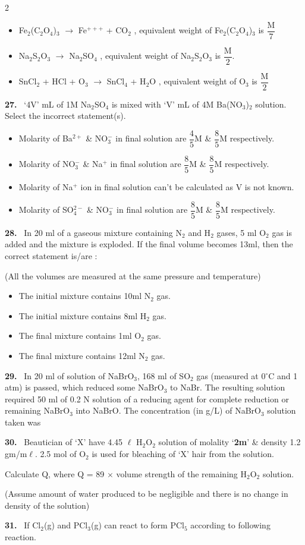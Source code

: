\documentclass[10pt]{extarticle}
\newcommand{\qn}[1]{\par\smallskip\noindent\textbf{#1.}~}
\newenvironment{qoptions}{\begin{itemize}[leftmargin=1.8em,itemsep=1pt,topsep=2pt,label={}]}{\end{itemize}}
\newcommand{\opt}[2]{\item[(#1)] #2}
\begin{document}
\begin{multicols}{2}
\begin{qoptions}
\opt{B}{Fe$_2$(C$_2$O$_4$)$_3$ $\longrightarrow$ Fe$^{+++}$ + CO$_2$ , equivalent weight of Fe$_2$(C$_2$O$_4$)$_3$ is $\dfrac{\mathrm M}7$}
\opt{C}{Na$_2$S$_2$O$_3$ $\longrightarrow$ Na$_2$SO$_4$ , equivalent weight of Na$_2$S$_2$O$_3$ is $\dfrac{\mathrm M}2$.}
\opt{D}{SnCl$_2$ + HCl + O$_3$ $\longrightarrow$ SnCl$_4$ + H$_2$O , equivalent weight of O$_3$ is $\dfrac{\mathrm M}2$}
\end{qoptions}
\qn{27} `4V' mL of 1M Na$_2$SO$_4$ is mixed with `V' mL of 4M Ba(NO$_3$)$_2$ solution. Select the incorrect statement(s).
\begin{qoptions}
\opt{A}{Molarity of Ba$^{2+}$ \& NO$_3^-$ in final solution are $\dfrac45$M \& $\dfrac85$M respectively.}
\opt{B}{Molarity of NO$_3^-$ \& Na$^+$ in final solution are $\dfrac85$M \& $\dfrac85$M respectively.}
\opt{C}{Molarity of Na$^+$ ion in final solution can't be calculated as V is not known.}
\opt{D}{Molarity of SO$_4^{2-}$ \& NO$_3^-$ in final solution are $\dfrac85$M \& $\dfrac85$M respectively.}
\end{qoptions}
\qn{28} In 20 ml of a gaseous mixture containing N$_2$ and H$_2$ gases, 5 ml O$_2$ gas is added and the mixture is exploded. If the final volume becomes 13ml, then the correct statement is/are :\par
(All the volumes are measured at the same pressure and temperature)
\begin{qoptions}
\opt{A}{The initial mixture contains 10ml N$_2$ gas.}
\opt{B}{The initial mixture contains 8ml H$_2$ gas.}
\opt{C}{The final mixture contains 1ml O$_2$ gas.}
\opt{D}{The final mixture contains 12ml N$_2$ gas.}
\end{qoptions}
\qn{29} In 20 ml of solution of NaBrO$_3$, 168 ml of SO$_2$ gas (measured at 0$^\circ$C and 1 atm) is passed, which reduced some NaBrO$_3$ to NaBr. The resulting solution required 50 ml of 0.2 N solution of a reducing agent for complete reduction or remaining NaBrO$_3$ into NaBrO. The concentration (in g/L) of NaBrO$_3$ solution taken was\par
[Br = 81, Na = 23, O = 16]
\qn{30} Beautician of `X' have 4.45 $\ell$ H$_2$O$_2$ solution of molality `\textbf{2m}' \& density 1.2 gm/m$\ell$. 2.5 mol of O$_2$ is used for bleaching of `X' hair from the solution.\par
Calculate Q, where Q = 89 $\times$ volume strength of the remaining H$_2$O$_2$ solution.\par
(Assume amount of water produced to be negligible and there is no change in density of the solution)
\qn{31} If Cl$_2$(g) and PCl$_3$(g) can react to form PCl$_5$ according to following reaction.\par

\end{multicols}
\end{document}
